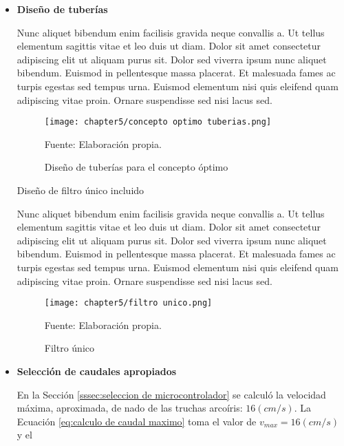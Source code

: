 \begin{itemize}
	
	\item \textbf{Diseño de tuberías}
	
	Nunc aliquet bibendum enim facilisis gravida neque convallis a. Ut tellus elementum sagittis vitae et leo duis ut diam. Dolor sit amet consectetur adipiscing elit ut aliquam purus sit. Dolor sed viverra ipsum nunc aliquet bibendum. Euismod in pellentesque massa placerat. Et malesuada fames ac turpis egestas sed tempus urna. Euismod elementum nisi quis eleifend quam adipiscing vitae proin. Ornare suspendisse sed nisi lacus sed.
	
	\begin{figure}[H]
		\centering
		\texttt{[image: chapter5/concepto optimo tuberias.png]}
		\caption{Diseño de tuberías para el concepto óptimo}
		\begin{myflushleftportland}
			Fuente: Elaboración propia.
		\end{myflushleftportland}
		\label{fig:concepto optimo tuberias}
	\end{figure}

	Diseño de filtro único incluido
	
	Nunc aliquet bibendum enim facilisis gravida neque convallis a. Ut tellus elementum sagittis vitae et leo duis ut diam. Dolor sit amet consectetur adipiscing elit ut aliquam purus sit. Dolor sed viverra ipsum nunc aliquet bibendum. Euismod in pellentesque massa placerat. Et malesuada fames ac turpis egestas sed tempus urna. Euismod elementum nisi quis eleifend quam adipiscing vitae proin. Ornare suspendisse sed nisi lacus sed.	
	
	\begin{figure}[H]
		\centering
		\texttt{[image: chapter5/filtro unico.png]}
		\caption{Filtro único}
		\begin{myflushleftportland}
			Fuente: Elaboración propia.
		\end{myflushleftportland}
		\label{fig:filtro unico}
	\end{figure}

	\item \textbf{Selección de caudales apropiados} 

	En la Sección \ref{sssec:seleccion de microcontrolador} se calculó la velocidad máxima, aproximada, de nado de las truchas arcoíris: $16 (cm/s)$. La Ecuación \ref{eq:calculo de caudal maximo} toma el valor de \textit{$v_{max}=16 (cm/s)$}  y el 
	

\end{itemize}
